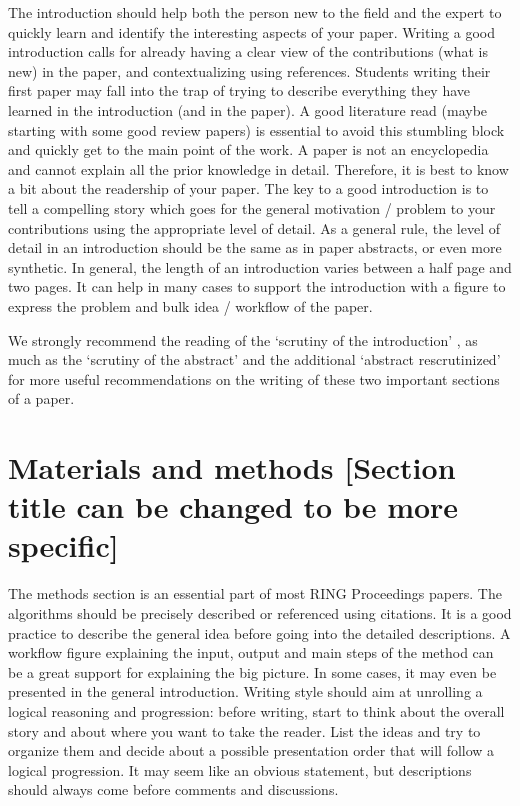 \documentclass[final]{ring}
\begin{document}
The introduction should help both the person new to the field and the expert to quickly learn and identify the interesting aspects of your paper. Writing a good introduction calls for already having a clear view of the contributions (what is new) in the paper, and contextualizing using references. Students writing their first paper may fall into the trap of trying to describe everything they have learned in the introduction (and in the paper). A good literature read (maybe starting with some good review papers) is essential to avoid this stumbling block and quickly get to the main point of the work. A paper is not an encyclopedia and cannot explain all the prior knowledge in detail. Therefore, it is best to know a bit about the readership of your paper. The key to a good introduction is to tell a compelling story which goes for the general motivation / problem to your contributions using the appropriate level of detail. As a general rule, the level of detail in an introduction should be the same as in paper abstracts, or even more synthetic. In general, the length of an introduction varies between a half page and two pages. It can help in many cases to support the introduction with a figure to express the problem and bulk idea / workflow of the paper. 

We strongly recommend the reading of the `scrutiny of the introduction' \citep{Claerbout1988S}, as much as the `scrutiny of the abstract' \citep{Landes1966BAAPG} and the additional `abstract rescrutinized' \citep{Lowman1998G} for more useful recommendations on the writing of these two important sections of a paper. 

\section{Materials and methods [Section title can be changed to be more specific]}
\label{Method}

The methods section is an essential part of most RING Proceedings papers. The algorithms should be precisely described or referenced using citations. It is a good practice to describe the general idea before going into the detailed descriptions. A workflow figure explaining the input, output and main steps of the method can be a great support for explaining the big picture. In some cases, it may even be presented in the general introduction. 
Writing style should aim at unrolling a logical reasoning and progression: before writing, start to think about the overall story and about where you want to take the reader. List the ideas and try to organize them and decide about a possible presentation order that will follow a logical progression. It may seem like an obvious statement, but descriptions should always come before comments and discussions. 
\end{document}
